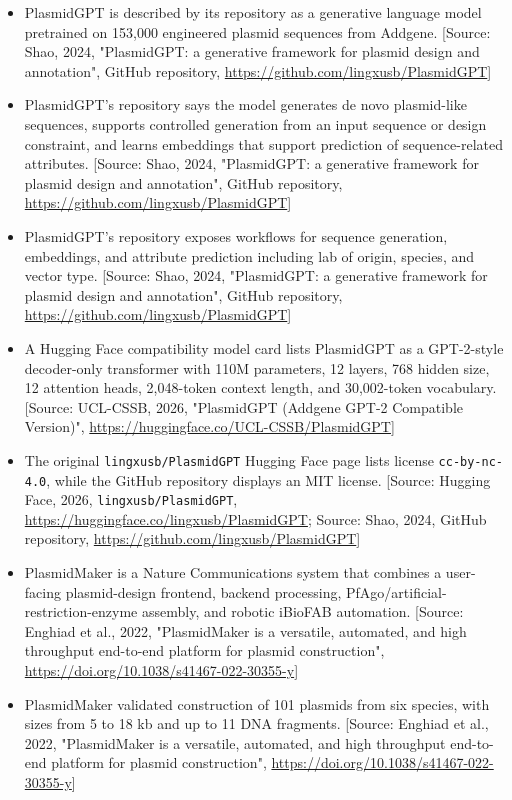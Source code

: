\documentclass[11pt]{report}
\begin{document}
\begin{itemize}
\item PlasmidGPT is described by its repository as a generative language model pretrained on 153,000 engineered plasmid sequences from Addgene. [Source: Shao, 2024, "PlasmidGPT: a generative framework for plasmid design and annotation", GitHub repository, \url{https://github.com/lingxusb/PlasmidGPT}]
\item PlasmidGPT's repository says the model generates de novo plasmid-like sequences, supports controlled generation from an input sequence or design constraint, and learns embeddings that support prediction of sequence-related attributes. [Source: Shao, 2024, "PlasmidGPT: a generative framework for plasmid design and annotation", GitHub repository, \url{https://github.com/lingxusb/PlasmidGPT}]
\item PlasmidGPT's repository exposes workflows for sequence generation, embeddings, and attribute prediction including lab of origin, species, and vector type. [Source: Shao, 2024, "PlasmidGPT: a generative framework for plasmid design and annotation", GitHub repository, \url{https://github.com/lingxusb/PlasmidGPT}]
\item A Hugging Face compatibility model card lists PlasmidGPT as a GPT-2-style decoder-only transformer with 110M parameters, 12 layers, 768 hidden size, 12 attention heads, 2,048-token context length, and 30,002-token vocabulary. [Source: UCL-CSSB, 2026, "PlasmidGPT (Addgene GPT-2 Compatible Version)", \url{https://huggingface.co/UCL-CSSB/PlasmidGPT}]
\item The original \texttt{lingxusb/PlasmidGPT} Hugging Face page lists license \texttt{cc-by-nc-4.0}, while the GitHub repository displays an MIT license. [Source: Hugging Face, 2026, \texttt{lingxusb/PlasmidGPT}, \url{https://huggingface.co/lingxusb/PlasmidGPT}; Source: Shao, 2024, GitHub repository, \url{https://github.com/lingxusb/PlasmidGPT}]
\item PlasmidMaker is a Nature Communications system that combines a user-facing plasmid-design frontend, backend processing, PfAgo/artificial-restriction-enzyme assembly, and robotic iBioFAB automation. [Source: Enghiad et al., 2022, "PlasmidMaker is a versatile, automated, and high throughput end-to-end platform for plasmid construction", \url{https://doi.org/10.1038/s41467-022-30355-y}]
\item PlasmidMaker validated construction of 101 plasmids from six species, with sizes from 5 to 18 kb and up to 11 DNA fragments. [Source: Enghiad et al., 2022, "PlasmidMaker is a versatile, automated, and high throughput end-to-end platform for plasmid construction", \url{https://doi.org/10.1038/s41467-022-30355-y}]

\end{itemize}
\end{document}
